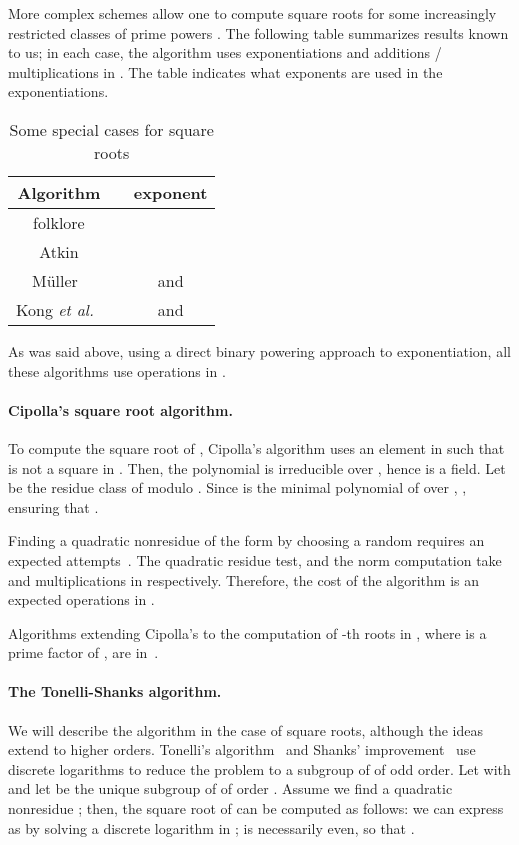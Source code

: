 \documentclass[12pt]{article}
\theoremstyle{plain}
\theoremstyle{definition}
\newcounter{algorithm}
\begin{document}
More complex schemes allow one to compute square roots for some
increasingly restricted classes of prime powers . The following
table summarizes results known to us; in each case, the algorithm uses
 exponentiations and  additions / multiplications in
. The table indicates what exponents are used in the
exponentiations.

  \begin{table}[h]
    \caption{Some special cases for square roots}\label{table1}
\begin{center}
\begin{tabular}{c|c|c}
Algorithm &  & exponent \\\hline
folklore  &  &  \\
Atkin     &  &  \\
M\"uller~\cite{Muller04} &  &  and \\
Kong {\it et al.}~\cite{KoCaYuLi06} &  &  and 
\end{tabular}
\end{center}
  \end{table}
\noindent As was said above, using a direct binary powering approach to
exponentiation, all these algorithms use  operations
in .

\paragraph{Cipolla's square root algorithm.} 
To compute the square root of , Cipolla's algorithm
uses an element  in  such that  is not a square in
. Then, the polynomial  is irreducible over
, hence  is a field. Let  be the
residue class of  modulo .  Since  is the
minimal polynomial of  over , , ensuring
that .

Finding a quadratic nonresidue of the form  by choosing a
random  requires an expected  attempts~\cite[page
  158]{BachSh1996}. The quadratic residue test, and the norm
computation take  and 
multiplications in  respectively. Therefore, the cost of the
algorithm is an expected  operations in .

Algorithms extending Cipolla's to the computation of -th roots in ,
where  is a prime factor of , are
in~\cite{Williams72,WiHa93,NiHaSuKu09}.

\paragraph{The Tonelli-Shanks algorithm.}
We will describe the algorithm in the case of square roots, although
the ideas extend to higher orders. Tonelli's
algorithm~\cite{Tonelli1891} and Shanks' improvement~\cite{Shanks1972}
use discrete logarithms to reduce the problem to a subgroup of
 of odd order. Let  with  and
let  be the unique subgroup of  of order . Assume we
find a quadratic nonresidue ; then, the square root of
 can be computed as follows: we can express  as  by solving a discrete logarithm in ;  is
necessarily even, so that .
\end{document}
